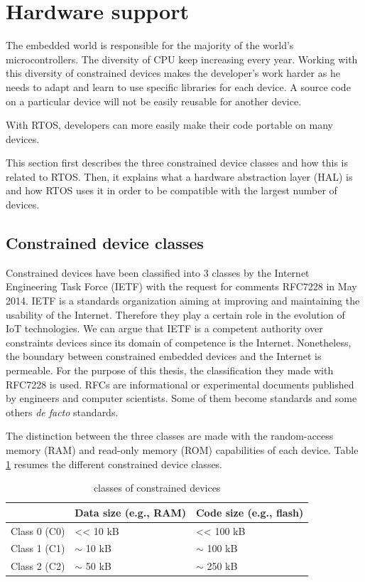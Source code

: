 \section{Hardware support}

The embedded world is responsible for the majority of the world's microcontrollers.
The diversity of CPU keep increasing every year.
Working with this diversity of constrained devices makes the developer's work harder as he needs to adapt and learn to use specific libraries for each device.
A source code on a particular device will not be easily reusable for another device.

With RTOS, developers can more easily make their code portable on many devices.

This section first describes the three constrained device classes and how this is related to RTOS.
Then, it explains what a hardware abstraction layer (HAL) is and how RTOS uses it in order to be compatible with the largest number of devices.

\subsection{Constrained device classes}

Constrained devices have been classified into 3 classes by the Internet Engineering Task Force (IETF) with the request for comments RFC7228\cite{RFC7228} in May 2014.
IETF is a standards organization aiming at improving and maintaining the usability of the Internet.
Therefore they play a certain role in the evolution of IoT technologies.
We can argue that IETF is a competent authority over constraints devices since its domain of competence is the Internet.
Nonetheless, the boundary between constrained embedded devices and the Internet is permeable.
For the purpose of this thesis, the classification they made with RFC7228 is used.
RFCs are informational or experimental documents published by engineers and computer scientists.
Some of them become standards and some others \textit{de facto} standards.

The distinction between the three classes are made with the random-access memory (RAM) and read-only memory (ROM) capabilities of each device.
Table \ref{tab:constrained-devices-classes} resumes the different constrained device classes.

\begin{table}[!h]
  \centering
  \begin{tabular}{|l|l|l|}
  \hline
   & Data size (e.g., RAM) & Code size (e.g., flash) \\ \hline
  Class 0 (C0) & \textless{}\textless{} 10 kB & \textless{}\textless{} 100 kB \\ %
  Class 1 (C1) & $\sim$ 10 kB & $\sim$ 100 kB \\ %
  Class 2 (C2) & $\sim$ 50 kB & $\sim$ 250 kB \\ \hline
  \end{tabular}
  \caption{classes of constrained devices}
  \label{tab:constrained-devices-classes}
\end{table}

